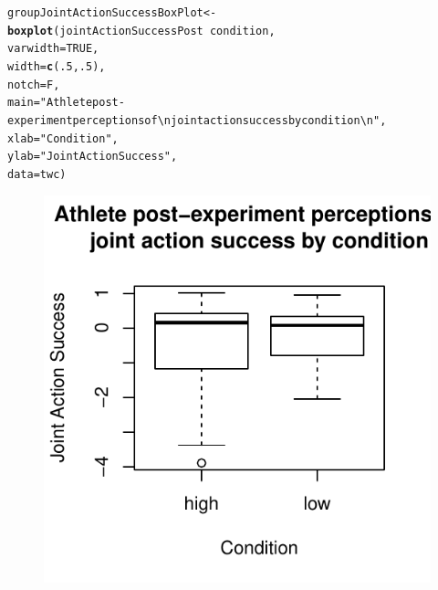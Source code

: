 \documentclass[english]{article}\usepackage[]{graphicx}\usepackage[]{color}
\makeatletter
\def\maxwidth{ %
  \ifdim\Gin@nat@width>\linewidth
    \linewidth
  \else
    \Gin@nat@width
  \fi
}
\newcommand{\hlnum}[1]{\textcolor[rgb]{0.686,0.059,0.569}{#1}}%
\newcommand{\hlstr}[1]{\textcolor[rgb]{0.192,0.494,0.8}{#1}}%
\newcommand{\hlopt}[1]{\textcolor[rgb]{0,0,0}{#1}}%
\newcommand{\hlstd}[1]{\textcolor[rgb]{0.345,0.345,0.345}{#1}}%
\newcommand{\hlkwb}[1]{\textcolor[rgb]{0.69,0.353,0.396}{#1}}%
\newcommand{\hlkwc}[1]{\textcolor[rgb]{0.333,0.667,0.333}{#1}}%
\newcommand{\hlkwd}[1]{\textcolor[rgb]{0.737,0.353,0.396}{\textbf{#1}}}%
\newenvironment{kframe}{%
 \def\at@end@of@kframe{}%
 \ifinner\ifhmode%
  \def\at@end@of@kframe{\end{minipage}}%
  \begin{minipage}{\columnwidth}%
 \fi\fi%
 \def\FrameCommand##1{\hskip\@totalleftmargin \hskip-\fboxsep
 \colorbox{shadecolor}{##1}\hskip-\fboxsep
     \hskip-\linewidth \hskip-\@totalleftmargin \hskip\columnwidth}%
 \MakeFramed {\advance\hsize-\width
   \@totalleftmargin\z@ \linewidth\hsize
   \@setminipage}}%
 {\par\unskip\endMakeFramed%
 \at@end@of@kframe}
\newenvironment{knitrout}{}{} %
\makeatother
\begin{document}
\begin{knitrout}
\color{fgcolor}\begin{kframe}
\begin{alltt}
\hlstd{groupJointActionSuccessBoxPlot} \hlkwb{<-} \hlkwd{boxplot}\hlstd{(jointActionSuccessPost} \hlopt{~} \hlstd{condition,}
                                        \hlkwc{varwidth} \hlstd{=} \hlnum{TRUE}\hlstd{,}
                                        \hlkwc{width} \hlstd{=} \hlkwd{c}\hlstd{(}\hlnum{.5}\hlstd{,}\hlnum{.5}\hlstd{),}
                                        \hlkwc{notch} \hlstd{= F,}
                                        \hlkwc{main} \hlstd{=} \hlstr{"Athlete post-experiment perceptions of \textbackslash{}n joint action success by condition \textbackslash{}n"}\hlstd{,}
                                        \hlkwc{xlab} \hlstd{=} \hlstr{"Condition"}\hlstd{,}
                                        \hlkwc{ylab} \hlstd{=} \hlstr{"Joint Action Success"}\hlstd{,}
                                        \hlkwc{data} \hlstd{= twc)}
\end{alltt}
\end{kframe}\begin{figure}

{\centering \includegraphics[width=\maxwidth]{figure/groupJointActionSuccessPostBoxPlot-1} 

}

\end{figure}


\end{knitrout}
\end{document}
